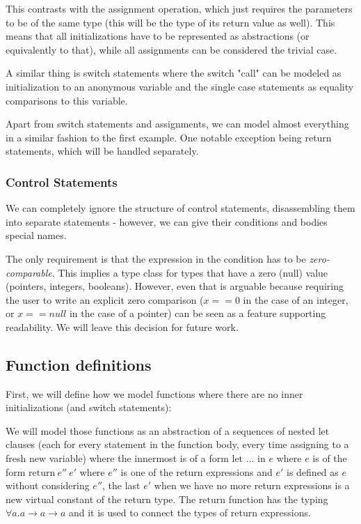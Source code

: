 This contrasts with the assignment operation, which just requires the parameters to be of the same type (this will be the type of its return value as well). This means that all initializations have to be represented as abstractions (or equivalently to that), while all assignments can be considered the trivial case.

A similar thing is switch statements where the switch "call" can be modeled as initialization to an anonymous variable and the single case statements as equality comparisons to this variable.

Apart from switch statements and assignments, we can model almost everything in a similar fashion to the first example. One notable exception being return statements, which will be handled separately.

\subsubsection{Control Statements}

We can completely ignore the structure of control statements, disassembling them into separate statements - however, we can give their conditions and bodies special names.

The only requirement is that the expression in the condition has to be \emph{zero-comparable}. This implies a type class for types that have a zero (null) value (pointers, integers, booleans). However, even that is arguable because requiring the user to write an explicit zero comparison ($x == 0$ in the case of an integer, or $x == null$ in the case of a pointer) can be seen as a feature supporting readability. We will leave this decision for future work.

\subsection{Function definitions}

First, we will define how we model functions where there are no inner initializations (and switch statements):

We will model those functions as an abstraction of a sequences of nested $\text{let}$ clauses (each for every statement in the function body, every time assigning to a fresh new variable) where the innermost is of a form $\text{let } \dots \text{ in } e$ where $e$ is of the form $\text{return}\ e''\ e'$ where $e''$ is one of the return expressions and $e'$ is defined as $e$ without considering $e''$, the last $e'$ when we have no more return expressions is a new virtual constant of the return type. The $\text{return}$ function has the typing $\forall a . a \rightarrow a \rightarrow a$ and it is used to connect the types of return expressions.

